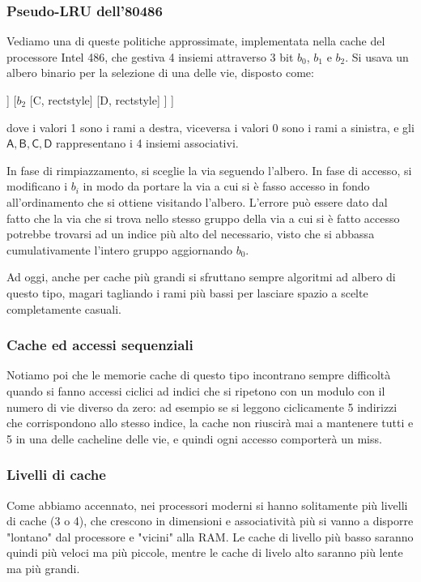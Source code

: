 \documentclass[a4paper,11pt]{article}
\begin{document}
\subsubsection{Pseudo-LRU dell'80486}
Vediamo una di queste politiche approssimate, implementata nella cache del processore Intel 486, che gestiva 4 insiemi attraverso 3 bit $b_0$, $b_1$ e $b_2$.
Si usava un albero binario per la selezione di una delle vie, disposto come:
\begin{center}
	\begin{forest}
		[$b_0$, roundstyle
			[$b_1$
				[A, rectstyle]
				[B, rectstyle]
				]
			[$b_2$
				[C, rectstyle]
				[D, rectstyle]
			]
		]	
	\end{forest}
\end{center}
dove i valori 1 sono i rami a destra, viceversa i valori 0 sono i rami a sinistra, e gli $\mathsf{A, B, C, D}$ rappresentano i 4 insiemi associativi.

In fase di rimpiazzamento, si sceglie la via seguendo l'albero.
In fase di accesso, si modificano i $b_i$ in modo da portare la via a cui si è fasso accesso in fondo all'ordinamento che si ottiene visitando l'albero.
L'errore può essere dato dal fatto che la via che si trova nello stesso gruppo della via a cui si è fatto accesso potrebbe trovarsi ad un indice più alto del necessario, visto che si abbassa cumulativamente l'intero gruppo aggiornando $b_0$.

\par\smallskip

Ad oggi, anche per cache più grandi si sfruttano sempre algoritmi ad albero di questo tipo, magari tagliando i rami più bassi per lasciare spazio a scelte completamente casuali.

\subsubsection{Cache ed accessi sequenziali}
Notiamo poi che le memorie cache di questo tipo incontrano sempre difficoltà quando si fanno accessi ciclici ad indici che si ripetono con un modulo con il numero di vie diverso da zero: ad esempio se si leggono ciclicamente 5 indirizzi che corrispondono allo stesso indice, la cache non riuscirà mai a mantenere tutti e 5 in una delle cacheline delle vie, e quindi ogni accesso comporterà un miss.

\subsubsection{Livelli di cache}
Come abbiamo accennato, nei processori moderni si hanno solitamente più livelli di cache (3 o 4), che crescono in dimensioni e associatività più si vanno a disporre "lontano" dal processore e "vicini" alla RAM.
Le cache di livello più basso saranno quindi più veloci ma più piccole, mentre le cache di livelo alto saranno più lente ma più grandi.
\end{document}
